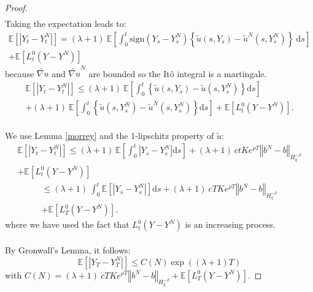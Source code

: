 \documentclass[12pt]{article}
\newcommand{\norme}[1]{\left\Vert #1\right\Vert}
\newcommand{\E}{\mathbb{E}}
\newcommand{\di}{\mathrm{d}}
\begin{document}
\begin{proof}
\begin{multline*}
     \end{multline*}    
    Taking the expectation leads to:
    \begin{multline*}
    \E\left[\left|Y_t-Y_t^N\right|\right] = (\lambda + 1)\ \E\left[\int_0^t\mathrm{sign}(Y_s-Y_s^N)\left\{\tilde{u}\left(s,Y_s\right)-\tilde{u}^N\left(s,Y_s^N\right)\right\}\ \di s\right]\\ + \E \left[L_t^0(Y-Y^N)\right]
    \end{multline*}
    because $\widetilde{\nabla u}$ and $\widetilde{\nabla u}^N$ are bounded so the Itô integral is a martingale.    
    \begin{multline*}
    \E\left[\left|Y_t-Y_t^N\right|\right]\leq (\lambda + 1)\ \E\left[\int_0^t\left\{\tilde{u}\left(s,Y_s\right)-\tilde{u}\left(s,Y_s^N\right)\right\} \di s\right]\\ +(\lambda + 1)\ \E\left[\int_0^t\left\{\tilde{u}\left(s,Y_s^N\right)-\tilde{u}^N\left(s,Y_s^N\right)\right\} \di s\right] + \E \left[L_t^0(Y-Y^N)\right].
    \end{multline*}    
    \paragraph{}
    We use Lemma \ref{morrey} and the 1-lipschitz property of $\tilde{u}$:
    \begin{multline*}
    \E\left[\left|Y_t-Y_t^N\right|\right]\leq (\lambda + 1)\ \E\left[\int_0^t\left|Y_s-Y_s^N\right| \di s\right] +(\lambda + 1)\ ctKe^{\rho T}\norme{b^N-b}_{H^{-\beta}_{q}}\\ + \E \left[L_t^0(Y-Y^N)\right]
    \end{multline*}    
    \begin{multline*}
    \leq (\lambda + 1)\ \int_0^t\E\left[\left|Y_s-Y_s^N\right|\right] \di s + (\lambda + 1)\ cTKe^{\rho T}\norme{b^N-b}_{H^{-\beta}_{q}}\\ + \E \left[L_T^0(Y-Y^N)\right].
    \end{multline*}
    where we have used the fact that $L_t^0(Y-Y^N)$ is an increasing process.    
    \paragraph{}
    By Gronwall's Lemma, it follows:
    \begin{equation}\label{gronwall}
    \E\left[\left|Y_T-Y_T^N\right|\right] \leq C(N) \exp((\lambda+1)T)
    \end{equation}
    with $C(N) = (\lambda + 1)\ cTKe^{\rho T}\norme{b^N-b}_{H^{-\beta}_{q}} + \E \left[L_T^0(Y-Y^N)\right].$      


\end{proof}
\end{document}
